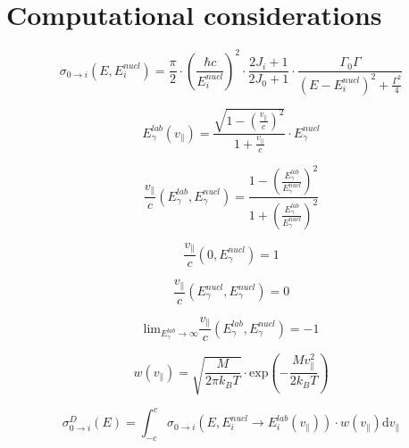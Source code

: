 \documentclass{article}
\begin{document}
\section{Computational considerations}

\begin{equation}
\label{breit_wigner}
\sigma_{0 \to i} (E, E_i^{nucl}) = \frac{\pi}{2} \cdot \left( \frac{\hbar c}{E_i^{nucl}} \right)^2 \cdot \frac{2 J_i + 1}{2 J_0 + 1} \cdot \frac{\Gamma_0 \Gamma}{\left( E - E_i^{nucl} \right)^2 + \frac{\Gamma^2}{4}}
\end{equation}

\begin{equation}
\label{doppler_shift}
E_\gamma^{lab}(v_\parallel) = \frac{\sqrt{1 - \left( \frac{v_\parallel}{c} \right)^2}}{1 + \frac{v_\parallel}{c}} \cdot E_\gamma^{nucl}
\end{equation}

\begin{equation}
\label{doppler_shift_inverse}
\frac{v_\parallel}{c} \left( E_\gamma^{lab}, E_\gamma^{nucl} \right) = \frac{1 - \left( \frac{E_\gamma^{lab}}{E_\gamma^{nucl}} \right)^2}{1 + \left( \frac{E_\gamma^{lab}}{E_\gamma^{nucl}} \right)^2}
\end{equation}

\begin{equation}
\frac{v_\parallel}{c} \left( 0, E_\gamma^{nucl} \right) = 1
\end{equation}

\begin{equation}
	\frac{v_\parallel}{c} \left( E_\gamma^{nucl}, E_\gamma^{nucl} \right) = 0
\end{equation}

\begin{equation}
\mathrm{lim}_{E_\gamma^{lab} \to \infty} \frac{v_\parallel}{c} \left( E_\gamma^{lab}, E_\gamma^{nucl} \right) = -1
\end{equation}

\begin{equation}
\label{maxwell_boltzmann_distribution}
w\left(v_\parallel \right) = \sqrt{\frac{M}{2 \pi k_B T}} \cdot \mathrm{exp} \left( -\frac{M v_\parallel^2}{2 k_B T} \right) 
\end{equation}

\begin{equation}
\label{pseudo_convolution_v}
\sigma^{D}_{0 \to i} (E) = \int_{-c}^{c} \sigma_{0 \to i} (E, E_i^{nucl} \to E_i^{lab}(v_\parallel)) \cdot w(v_\parallel) \mathrm{d} v_\parallel
\end{equation}
\end{document}
